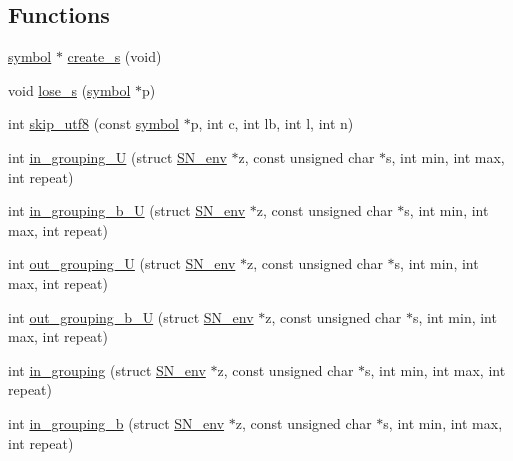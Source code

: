\subsection*{Functions}
\begin{DoxyCompactItemize}
\item 
\mbox{\hyperlink{namespaceirk_1_1porter2_afd04c4eb58a1dabcf8f3ab2d7e9f9ed5}{symbol}} $\ast$ \mbox{\hyperlink{namespaceirk_1_1porter2_ae4f10211c905eac3b423e5f924798327}{create\+\_\+s}} (void)
\item 
void \mbox{\hyperlink{namespaceirk_1_1porter2_a4290ad89b1ff3fea860029e00555d593}{lose\+\_\+s}} (\mbox{\hyperlink{namespaceirk_1_1porter2_afd04c4eb58a1dabcf8f3ab2d7e9f9ed5}{symbol}} $\ast$p)
\item 
int \mbox{\hyperlink{namespaceirk_1_1porter2_a2360f26767fbaa0a3d9a1b27da2a5685}{skip\+\_\+utf8}} (const \mbox{\hyperlink{namespaceirk_1_1porter2_afd04c4eb58a1dabcf8f3ab2d7e9f9ed5}{symbol}} $\ast$p, int c, int lb, int l, int n)
\item 
int \mbox{\hyperlink{namespaceirk_1_1porter2_ae82885401e05e98bbad5533eb7d749e5}{in\+\_\+grouping\+\_\+U}} (struct \mbox{\hyperlink{structirk_1_1porter2_1_1SN__env}{S\+N\+\_\+env}} $\ast$z, const unsigned char $\ast$s, int min, int max, int repeat)
\item 
int \mbox{\hyperlink{namespaceirk_1_1porter2_a4fb88709866ab6e5aa2618c444b14cc7}{in\+\_\+grouping\+\_\+b\+\_\+U}} (struct \mbox{\hyperlink{structirk_1_1porter2_1_1SN__env}{S\+N\+\_\+env}} $\ast$z, const unsigned char $\ast$s, int min, int max, int repeat)
\item 
int \mbox{\hyperlink{namespaceirk_1_1porter2_a1e111b2024901f834ec4965fb4c085cf}{out\+\_\+grouping\+\_\+U}} (struct \mbox{\hyperlink{structirk_1_1porter2_1_1SN__env}{S\+N\+\_\+env}} $\ast$z, const unsigned char $\ast$s, int min, int max, int repeat)
\item 
int \mbox{\hyperlink{namespaceirk_1_1porter2_a5a28c19f32c794a27ab0672e0a52fe1a}{out\+\_\+grouping\+\_\+b\+\_\+U}} (struct \mbox{\hyperlink{structirk_1_1porter2_1_1SN__env}{S\+N\+\_\+env}} $\ast$z, const unsigned char $\ast$s, int min, int max, int repeat)
\item 
int \mbox{\hyperlink{namespaceirk_1_1porter2_acc700c6b29e6c125665f86074d4ab588}{in\+\_\+grouping}} (struct \mbox{\hyperlink{structirk_1_1porter2_1_1SN__env}{S\+N\+\_\+env}} $\ast$z, const unsigned char $\ast$s, int min, int max, int repeat)
\item 
int \mbox{\hyperlink{namespaceirk_1_1porter2_ad71c33734138a8364a4dcea25fe95b8d}{in\+\_\+grouping\+\_\+b}} (struct \mbox{\hyperlink{structirk_1_1porter2_1_1SN__env}{S\+N\+\_\+env}} $\ast$z, const unsigned char $\ast$s, int min, int max, int repeat)

\end{DoxyCompactItemize}
